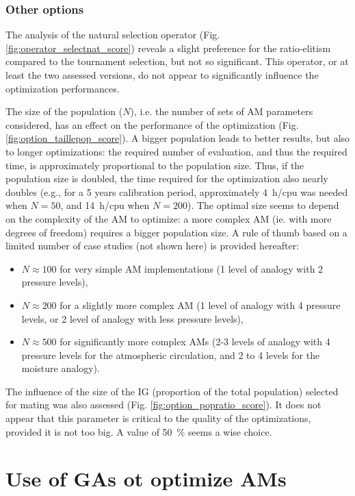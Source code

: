 \documentclass{ametsoc}
\begin{document}
\subsubsection{Other options}

The analysis of the natural selection operator (Fig. \ref{fig:operator_selectnat_score}) reveals a slight preference for the ratio-elitism compared to the tournament selection, but not so significant. This operator, or at least the two assessed versions, do not appear to significantly influence the optimization performances.

The size of the population ($N$), i.e. the number of sets of AM parameters considered, has an effect on the performance of the optimization (Fig. \ref{fig:option_taillepop_score}). A bigger population leads to better results, but also to longer optimizations: the required number of evaluation, and thus the required time, is approximately proportional to the population size. Thus, if the population size is doubled, the time required for the optimization also nearly doubles (e.g., for a 5 years calibration period, approximately 4~h/cpu was needed when $N = 50$, and 14~h/cpu when $N = 200$). The optimal size seems to depend on the complexity of the AM to optimize: a more complex AM (ie. with more degrees of freedom) requires a bigger population size. A rule of thumb based on a limited number of case studies (not shown here) is provided hereafter:

\begin{itemize}
	\item $N\approx100$ for very simple AM implementations (1 level of analogy with 2 pressure levels),
	\item $N\approx200$ for a slightly more complex AM (1 level of analogy with 4 pressure levels, or 2 level of analogy with less pressure levels),
	\item $N\approx500$ for significantly more complex AMs (2-3 levels of analogy with 4 pressure levels for the atmospheric circulation, and 2 to 4 levels for the moisture analogy).
\end{itemize}

The influence of the size of the IG (proportion of the total population) selected for mating was also assessed (Fig. \ref{fig:option_popratio_score}). It does not appear that this parameter is critical to the quality of the optimizations, provided it is not too big. A value of 50~\% seems a wise choice.


\section{Use of GAs ot optimize AMs}
\label{sec:use}
\end{document}

